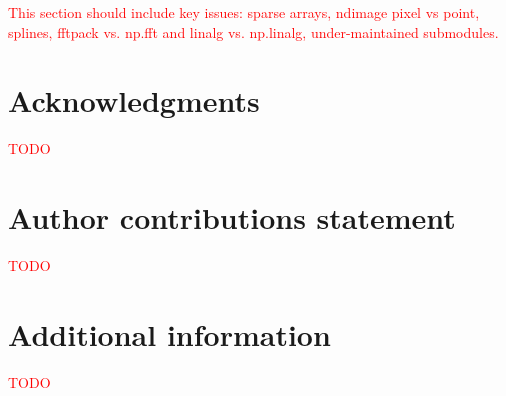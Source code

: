 \documentclass[fleqn,10pt]{wlscirep}
\newcommand{\fixme}[1]{\textcolor{red}{{#1}}}
\begin{document}
\fixme{This section should include key issues: sparse arrays, ndimage pixel vs
point, splines, fftpack vs. np.fft and linalg vs. np.linalg, under-maintained
submodules.}




\section*{Acknowledgments}

\fixme{TODO}


\section*{Author contributions statement}

\fixme{TODO}


\section*{Additional information}

\fixme{TODO}


\end{document}
